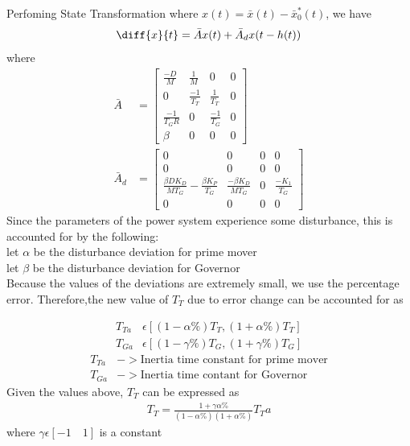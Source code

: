 \documentclass[journal]{IEEEtran}
\begin{document}
Perfoming State Transformation where $x(t) = \bar{x}(t)-\bar{x}_0^*(t)$, we have
\begin{equation}
  \diff{x}{t} = \bar{A}x(t) + \bar{A}_dx(t-h(t)) \\
\end{equation}
where 
\begin{align}
  \bar{A} &=
  \begin{bmatrix}
    \frac{-D}{M} & \frac{1}{M} & 0 & 0 \\
    0 & \frac{-1}{T_T} & \frac{1}{T_T} & 0 \\
    \frac{-1}{T_GR} & 0& \frac{-1}{T_G} & 0 \\
    \beta & 0 & 0 & 0
  \end{bmatrix} \\
  \bar{A}_d &=
  \begin{bmatrix}
    0 & 0 & 0 & 0 \\
    0 & 0 & 0 & 0 \\
    \frac{\beta D K_D}{MT_G} - \frac{\beta K_{P}}{T_G} & \frac{-\beta K_D}{MT_G} & 0 & \frac{-K_1}{T_G} \\
    0 & 0 & 0 & 0
  \end{bmatrix}
\end{align}
Since the parameters of the power system experience some disturbance, this is accounted for by the following: \\
 let $\alpha$ be the disturbance deviation for prime mover \\
 let $\beta$ be the disturbance deviation for Governor \\
 
 Because the values of the deviations are extremely small, we use the percentage error.
 Therefore,the new value of $T_T$ due to error change can be accounted for as

 \begin{align}
   T_{Ta} &\epsilon [(1-\alpha \%)T_T, (1+\alpha\%)T_T] \\
   T_{Ga} &\epsilon [(1-\gamma \%)T_G, (1+\gamma\%)T_G]
 \end{align}
 \begin{align}
   T_{Ta} &-> \text{Inertia time constant for prime mover} \\
   T_{Ga} &-> \text{Inertia time contant for Governor}
 \end{align}
  Given the values above, $T_T$ can be expressed as
  \begin{align}
    T_T = \frac{1+\gamma \alpha \%}{(1-\alpha \%)(1+\alpha \%)} T_Ta
  \end{align}
  where $\gamma \epsilon [-1\quad1]$ is a constant \\ 
   
\end{document}
